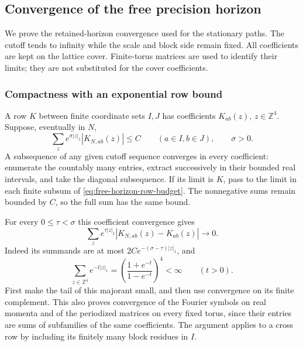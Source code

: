 \subsection{Convergence of the free precision horizon}
\label{sec:free-horizon-convergence}
We prove the retained-horizon convergence used for the stationary paths.
The cutoff tends to infinity while the scale and block side remain fixed.
All coefficients are kept on the lattice cover. Finite-torus matrices are
used to identify their limits; they are not substituted for the cover
coefficients.

\subsubsection{Compactness with an exponential row bound}
A row $K$ between finite coordinate sets $I,J$ has coefficients
$K_{ab}(z)$, $z\in\mathbb Z^4$. Suppose, eventually in $N$,
\begin{equation}\label{eq:free-horizon-row-budget}
 \sum_z e^{\sigma|z|_1}|K_{N,ab}(z)|\le C
 \qquad(a\in I,b\in J),\qquad \sigma>0.
\end{equation}
A subsequence of any given cutoff sequence converges in every coefficient:
enumerate the countably many entries, extract successively in their bounded
real intervals, and take the diagonal subsequence. If its limit is $K$,
pass to the limit in each finite subsum of
\eqref{eq:free-horizon-row-budget}. The nonnegative sums remain bounded
by $C$, so the full sum has the same bound.

For every $0\le\tau<\sigma$ this coefficient convergence gives
\begin{equation}\label{eq:free-horizon-narrower}
       \sum_z e^{\tau|z|_1}|K_{N,ab}(z)-K_{ab}(z)|\longrightarrow0.
\end{equation}
Indeed its summands are at most
$2C e^{-(\sigma-\tau)|z|_1}$, and
\[
 \sum_{z\in\mathbb Z^4}e^{-t|z|_1}
       =\left(\frac{1+e^{-t}}{1-e^{-t}}\right)^4<\infty
       \qquad(t>0).
\]
First make the tail of this majorant small, and then use convergence
on its finite complement. This also proves convergence of the Fourier
symbols on real momenta and of the periodized matrices on every fixed
torus, since their entries are sums of subfamilies of the same coefficients.
The argument applies to a cross row by including its finitely many block
residues in $I$.

